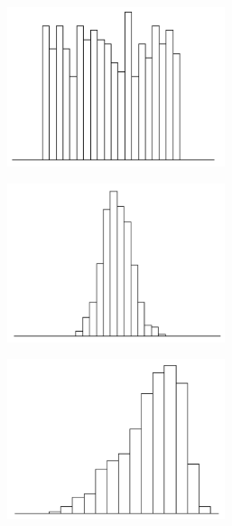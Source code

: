 \begin{figure}[H]
  \centering

  \begin{subfigure}{0.3\textwidth}
    \centering
    \includegraphics[width=0.7\textwidth]{assets/visualization_and_extraction/single_feature_example/distr_uniform.png}
  \end{subfigure}\hspace*{0.01\textwidth}
  \begin{subfigure}{0.3\textwidth}
    \centering
    \includegraphics[width=0.7\textwidth]{assets/visualization_and_extraction/single_feature_example/distr_uni_normal.png}
  \end{subfigure}\hspace*{0.01\textwidth}
  \begin{subfigure}{0.3\textwidth}
    \centering
    \includegraphics[width=0.7\textwidth]{assets/visualization_and_extraction/single_feature_example/distr_uni_right.png}
  \end{subfigure}
  

\end{figure}
